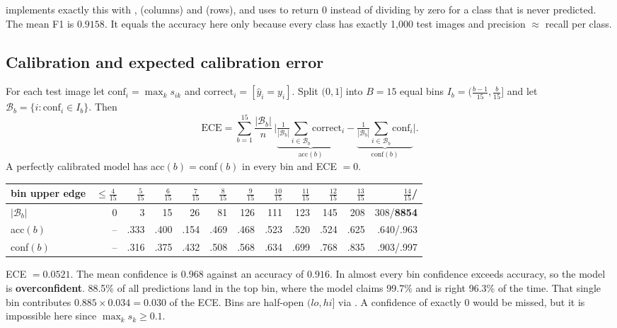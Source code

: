 \begin{repo}
 implements exactly this with ,  (columns) and  (rows), and uses  to return 0 instead of dividing by zero for a class that is never predicted. The mean F1 is $0.9158$. It equals the accuracy here only because every class has exactly 1{,}000 test images and precision $\approx$ recall per class.
\end{repo}

\subsection{Calibration and expected calibration error}
\label{sec:calib}

\begin{idea}
For each test image let $\text{conf}_i=\max_k s_{ik}$ and $\text{correct}_i=[\hat y_i=y_i]$. Split $(0,1]$ into $B=15$ equal bins $I_b=(\tfrac{b-1}{15},\tfrac{b}{15}]$ and let $\mathcal B_b=\{i:\text{conf}_i\in I_b\}$. Then
\[
  \text{ECE} = \sum_{b=1}^{15}\frac{|\mathcal B_b|}{n}\,\Big|\underbrace{\tfrac{1}{|\mathcal B_b|}\textstyle\sum_{i\in\mathcal B_b}\text{correct}_i}_{\text{acc}(b)} - \underbrace{\tfrac{1}{|\mathcal B_b|}\textstyle\sum_{i\in\mathcal B_b}\text{conf}_i}_{\text{conf}(b)}\Big| .
\]
A perfectly calibrated model has acc$(b)=$conf$(b)$ in every bin and ECE $=0$.
\end{idea}

\begin{repo}[\texttt{calibration(probs, labels, n\_bins=15)}]
\begin{center}
\scriptsize
\setlength{\tabcolsep}{3.2pt}
\begin{tabular}{@{}lrrrrrrrrrrr@{}}
\toprule
bin upper edge & $\le\!\frac{4}{15}$ & $\frac{5}{15}$ & $\frac{6}{15}$ & $\frac{7}{15}$ & $\frac{8}{15}$ & $\frac{9}{15}$ & $\frac{10}{15}$ & $\frac{11}{15}$ & $\frac{12}{15}$ & $\frac{13}{15}$ & $\frac{14}{15}$\;/\;1\\
\midrule
$|\mathcal B_b|$ & 0 & 3 & 15 & 26 & 81 & 126 & 111 & 123 & 145 & 208 & 308\;/\;\textbf{8854}\\
acc$(b)$ & -- & .333 & .400 & .154 & .469 & .468 & .523 & .520 & .524 & .625 & .640\;/\;.963\\
conf$(b)$ & -- & .316 & .375 & .432 & .508 & .568 & .634 & .699 & .768 & .835 & .903\;/\;.997\\
\bottomrule
\end{tabular}
\end{center}
ECE $=0.0521$. The mean confidence is $0.968$ against an accuracy of $0.916$. In almost every bin confidence exceeds accuracy, so the model is \textbf{overconfident}. 88.5\% of all predictions land in the top bin, where the model claims 99.7\% and is right 96.3\% of the time. That single bin contributes $0.885\times0.034=0.030$ of the ECE. Bins are half-open $(lo,hi]$ via . A confidence of exactly 0 would be missed, but it is impossible here since $\max_k s_k\ge0.1$.
\end{repo}

